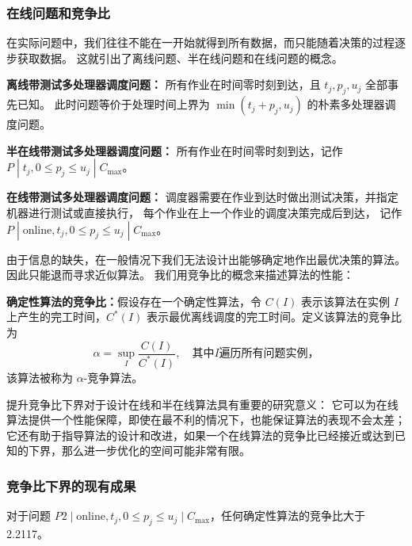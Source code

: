 \subsubsection{在线问题和竞争比}

在实际问题中，我们往往不能在一开始就得到所有数据，而只能随着决策的过程逐步获取数据。
这就引出了离线问题、半在线问题和在线问题的概念。

\begin{defi}
    \textbf{离线带测试多处理器调度问题：}
    所有作业在时间零时刻到达，且 $t_j, p_j, u_j$ 全部事先已知。
    此时问题等价于处理时间上界为 $\min(t_j+p_j,u_j)$ 的朴素多处理器调度问题。
\end{defi}

\begin{defi}
    \textbf{半在线带测试多处理器调度问题：}
    所有作业在时间零时刻到达，记作 $P\;|\;t_j,0\leq p_j\leq u_j\;|\;C_{\text{max}}$。
\end{defi}

\begin{defi}
    \textbf{在线带测试多处理器调度问题：}
    调度器需要在作业到达时做出测试决策，并指定机器进行测试或直接执行，
    每个作业在上一个作业的调度决策完成后到达，
    记作 $P \; | \; \text{online}, t_j, 0\leq p_j \leq u_j \; | \; C_{\text{max}}$。
\end{defi}

由于信息的缺失，在一般情况下我们无法设计出能够确定地作出最优决策的算法。
因此只能退而寻求近似算法。
我们用竞争比的概念来描述算法的性能：

\begin{defi}
    \textbf{确定性算法的竞争比：}假设存在一个确定性算法，令 $C(I)$ 表示该算法在实例 $I$ 上产生的完工时间，$C^*(I)$ 表示最优离线调度的完工时间。定义该算法的竞争比为
    \[
        \alpha=\sup_{I} \frac{C(I)}{C^*(I)}, \quad \text{其中} I \text{遍历所有问题实例，}
    \]
    该算法被称为 $\alpha$-竞争算法。
\end{defi}

提升竞争比下界对于设计在线和半在线算法具有重要的研究意义：
它可以为在线算法提供一个性能保障，即使在最不利的情况下，也能保证算法的表现不会太差；
它还有助于指导算法的设计和改进，如果一个在线算法的竞争比已经接近或达到已知的下界，那么进一步优化的空间可能非常有限。

\subsubsection{竞争比下界的现有成果}

\begin{thm}
    \label{thm:bound2}
    对于问题 $P2\mid\text{online}, t_j, 0\leq p_j \leq u_j \mid C_{\text{max}}$，任何确定性算法的竞争比大于 2.2117。\cite{albers2021scheduling}
\end{thm}

